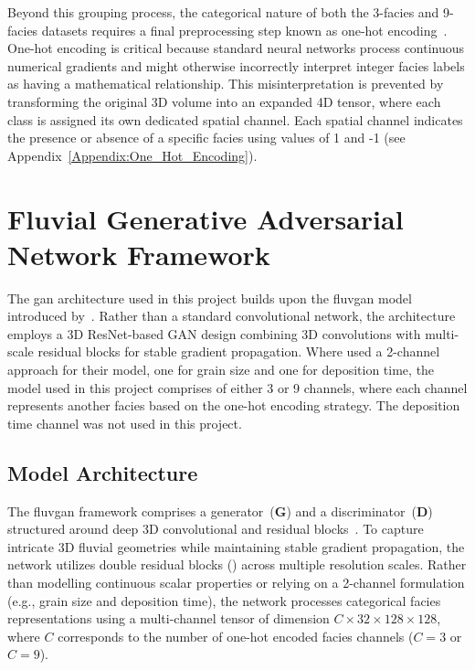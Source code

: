 Beyond this grouping process, the categorical nature of both the 3-facies and 9-facies datasets requires a final preprocessing step known as one-hot encoding~\parencite{goodfellow-et-al-2016}. One-hot encoding is critical because standard neural networks process continuous numerical gradients and might otherwise incorrectly interpret integer facies labels as having a mathematical relationship. This misinterpretation is prevented by transforming the original 3D volume into an expanded 4D tensor, where each class is assigned its own dedicated spatial channel. Each spatial channel indicates the presence or absence of a specific facies using values of 1 and -1 (see Appendix~\ref{Appendix:One_Hot_Encoding}).

\section{Fluvial Generative Adversarial Network Framework}\label{Subsec:Fluvgan}
The \gls{gan} architecture used in this project builds upon the \gls{fluvgan} model introduced by~\textcite{rongier2025afluvgan}. Rather than a standard convolutional network, the architecture employs a 3D ResNet-based GAN design combining 3D convolutions with multi-scale residual blocks for stable gradient propagation. Where \textcite{rongier2025atowards} used a 2-channel approach for their model, one for grain size and one for deposition time, the model used in this project comprises of either 3 or 9 channels, where each channel represents another facies based on the one-hot encoding strategy. The deposition time channel was not used in this project.

\subsection{Model Architecture}\label{Subsec:Model_architecture}
The \gls{fluvgan} framework comprises a generator~($\mathbf{G}$) and a discriminator~($\mathbf{D}$) structured around deep 3D convolutional and residual blocks~\parencite{he2016deep, rongier2025afluvgan}. To capture intricate 3D fluvial geometries while maintaining stable gradient propagation, the network utilizes double residual blocks () across multiple resolution scales. Rather than modelling continuous scalar properties or relying on a 2-channel formulation (e.g., grain size and deposition time), the network processes categorical facies representations using a multi-channel tensor of dimension $C \times 32 \times 128 \times 128$, where $C$ corresponds to the number of one-hot encoded facies channels ($C=3$ or $C=9$).


